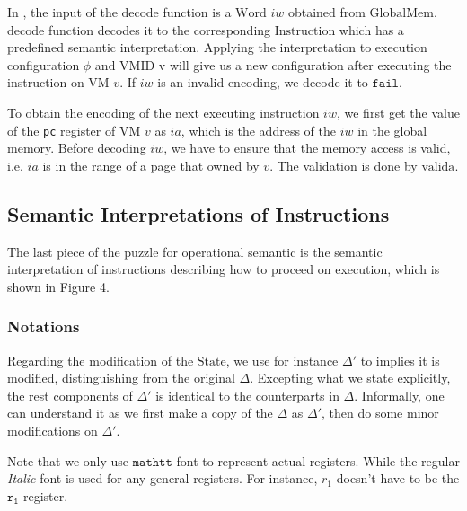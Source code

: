 \documentclass[a4paper]{article}
\newcommand*{\STATE}{\text{State}}
\newcommand*{\MEM}{\text{GlobalMem}}
\newcommand*{\WORD}{\text{Word}}
\newcommand*{\VMID}{\text{VMID}}
\newcommand*{\INSTR}{\text{Instruction}}
\newcommand*{\decode}{\text{decode}}
\newcommand*{\valida}{\text{valida}}
\newcommand{\refr}[1]{\hyperlink{#1}{\TirName {#1}}}
\begin{document}
In \refr{ExecInstr}, the input of the $\decode$ function is a $\WORD$ $iw$
obtained from $\MEM$. $\decode$ function decodes it to the corresponding
$\INSTR$ which has a predefined semantic interpretation. Applying the
interpretation to execution configuration $\phi$ and $\VMID$ v will give us a
new configuration after executing the instruction on VM $v$. If $iw$ is an
invalid encoding, we decode it to $\mathtt{fail}$.

To obtain the encoding of the next executing instruction $iw$, we first get the
value of the \texttt{pc} register of VM $v$ as $ia$, which is the address of the
$iw$ in the global memory. Before decoding $iw$, we have to ensure that the
memory access is valid, i.e. $ia$ is in the range of a page that owned by $v$.
The validation is done by $\valida$.


\subsection{Semantic Interpretations of Instructions}

The last piece of the puzzle for operational semantic is the semantic
interpretation of instructions describing how to proceed on execution, which is shown
in Figure 4.
\subsubsection{Notations}
Regarding the modification of the $\STATE$, we use for instance $\Delta'$ to
implies it is modified, distinguishing from the original $\Delta$. Excepting
what we state explicitly, the rest components of $\Delta'$ is
identical to the counterparts in $\Delta$. Informally, one can understand it as we first
make a copy of the $\Delta$ as $\Delta'$, then do some minor modifications on
$\Delta'$.

Note that we only use $\mathtt{mathtt}$ font to represent actual registers.
While the regular \emph{Italic} font is used for any general registers. For instance,
$r_{1}$ doesn't have to be the $\mathtt{r_{1}}$ register.
\end{document}
